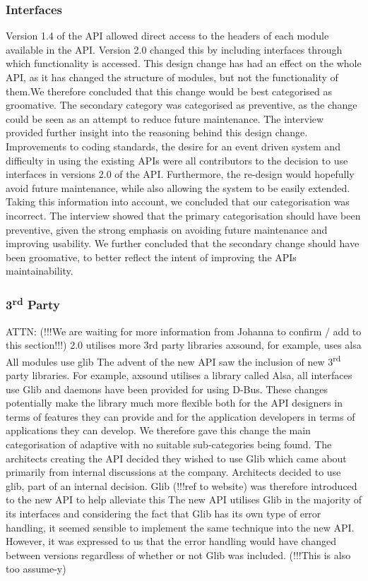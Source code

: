 \documentclass{sig-alternate}
\begin{document}
\subsubsection{Interfaces} %
Version 1.4 of the API allowed direct access to the headers of each module available in the API. Version 2.0 changed this by including interfaces through which functionality is accessed. This design change has had an effect on the whole API, as it has changed the structure of modules, but not the functionality of them.We therefore concluded that this change would be best categorised as  groomative. The secondary category was categorised as preventive, as the change could be seen as an attempt to reduce future maintenance. The interview provided further insight into the reasoning behind this design change. Improvements to coding standards, the desire for an event driven system and difficulty in using the existing APIs were all contributors to the decision to use interfaces in versions 2.0 of the API. Furthermore, the re-design would hopefully avoid future maintenance, while also allowing the system to be easily extended. Taking this information into account, we concluded that our categorisation was incorrect. The interview showed that the primary categorisation should have been preventive, given the strong emphasis on avoiding future maintenance and improving usability. We further concluded that the secondary change should have been groomative, to better reflect the intent of improving the APIs maintainability.

\subsubsection{3\textsuperscript{rd} Party}
ATTN: (!!!We are waiting for more information from Johanna to confirm / add to this section!!!)
2.0 utilises more 3rd party libraries
axsound, for example, uses alsa
All modules use glib
The advent of the new API saw the inclusion of new 3\textsuperscript{rd} party libraries. For example, axsound utilises a library called Alsa, all interfaces use Glib and daemons have been provided for using D-Bus. These changes potentially make the library much more flexible both for the API designers in terms of features they can provide and for the application developers in terms of applications they can develop.
We therefore gave this change the main categorisation of adaptive with no suitable sub-categories being found.
The architects creating the API decided they wished to use Glib which came about primarily from internal discussions at the company.
Architects decided to use glib, part of an internal decision. 
Glib (!!!ref to website) was therefore introduced to the new API to help alleviate this 
The new API utilises Glib in the majority of its interfaces and considering the fact that Glib has its own type of error handling, it seemed sensible to implement the same technique into the new API. However, it was expressed to us that the error handling would have changed between versions regardless of whether or not Glib was included. (!!!This is also too assume-y)
\end{document}
